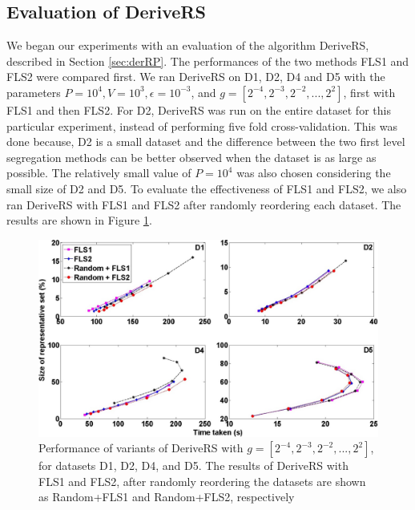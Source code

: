 \documentclass[twoside]{article}
\begin{document}
\subsection{Evaluation of DeriveRS} \label{sec:derRS}
We began our experiments with an evaluation of the algorithm DeriveRS, described in Section \ref{sec:derRP}. The performances of the two methods FLS1 and FLS2 were compared first. We ran DeriveRS on D1, D2, D4 and D5 with the parameters $P = 10^4, V = 10^3, \epsilon = 10^{-3}$, and $g = [2^{-4},2^{-3},2^{-2},...,2^2]$, first with FLS1 and then FLS2. For D2, DeriveRS was run on the entire dataset for this particular experiment, instead of performing five fold cross-validation. This was done because, D2 is a small dataset and the difference between the two first level segregation methods can be better observed when the dataset is as large as possible. The relatively small value of $P = 10^4$ was also chosen considering the small size of D2 and D5. To evaluate the effectiveness of FLS1 and FLS2, we also ran DeriveRS with FLS1 and FLS2 after randomly reordering each dataset. The results are shown in Figure \ref{fig:resFLS}.

\begin{figure}[h!]
\centering
\includegraphics[scale = 0.38]{FLSexp}
\caption{Performance of variants of DeriveRS with $g = [2^{-4},2^{-3},2^{-2},...,2^2]$, for datasets D1, D2, D4, and D5. The results of DeriveRS with FLS1 and FLS2, after randomly reordering the datasets are shown as Random+FLS1 and Random+FLS2, respectively}\label{fig:resFLS}
\end{figure}
\end{document}

